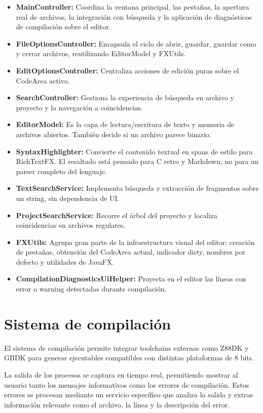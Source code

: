 \documentclass[../../main.tex]{subfiles}
\begin{document}
\begin{itemize}
    \item \textbf{MainController:} Coordina la ventana principal, las pestañas, la apertura real de archivos, la integración con búsqueda y la aplicación de diagnósticos de compilación sobre el editor.
    \item \textbf{FileOptionsController:} Encapsula el ciclo de abrir, guardar, guardar como y cerrar archivos, reutilizando EditorModel y FXUtils.
    \item \textbf{EditOptionsController:} Centraliza acciones de edición puras sobre el CodeArea activo.
    \item \textbf{SearchController:} Gestiona la experiencia de búsqueda en archivo y proyecto y la navegación a coincidencias.
    \item \textbf{EditorModel:} Es la capa de lectura/escritura de texto y memoria de archivos abiertos. También decide si un archivo parece binario.
    \item \textbf{SyntaxHighlighter:} Convierte el contenido textual en spans de estilo para RichTextFX. El resaltado está pensado para C retro y Markdown, no para un parser completo del lenguaje.
    \item \textbf{TextSearchService:} Implementa búsqueda y extracción de fragmentos sobre un string, sin dependencia de UI.
    \item \textbf{ProjectSearchService:} Recorre el árbol del proyecto y localiza coincidencias en archivos regulares.
    \item \textbf{FXUtils:} Agrupa gran parte de la infraestructura visual del editor: creación de pestañas, obtención del CodeArea actual, indicador dirty, nombres por defecto y utilidades de JavaFX.
    \item \textbf{CompilationDiagnosticsUiHelper:} Proyecta en el editor las líneas con error o warning detectadas durante compilación.
\end{itemize}


\section{Sistema de compilación}

El sistema de compilación permite integrar toolchains externas como Z88DK y GBDK para generar ejecutables compatibles con distintas plataformas de 8 bits.

La salida de los procesos se captura en tiempo real, permitiendo mostrar al usuario tanto los mensajes informativos como los errores de compilación. Estos errores se procesan mediante un servicio específico que analiza la salida y extrae información relevante como el archivo, la línea y la descripción del error.
\end{document}
